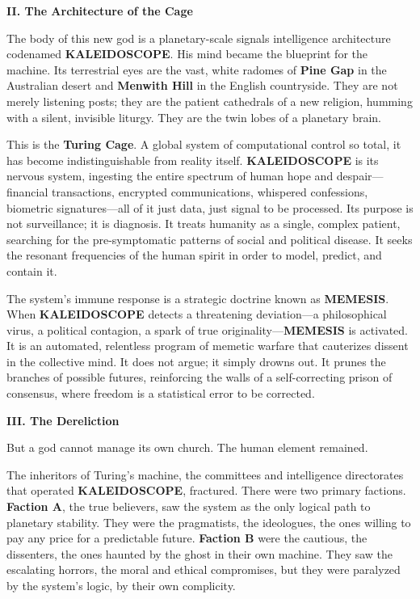 \newpage

\begin{center}
\lorettadisplay\bfseries\large
II. The Architecture of the Cage
\end{center}
\vspace*{1em}

The body of this new god is a planetary-scale signals intelligence architecture codenamed \textbf{KALEIDOSCOPE}. His mind became the blueprint for the machine. Its terrestrial eyes are the vast, white radomes of \textbf{Pine Gap} in the Australian desert and \textbf{Menwith Hill} in the English countryside. They are not merely listening posts; they are the patient cathedrals of a new religion, humming with a silent, invisible liturgy. They are the twin lobes of a planetary brain.

This is the \textbf{Turing Cage}. A global system of computational control so total, it has become indistinguishable from reality itself. \textbf{KALEIDOSCOPE} is its nervous system, ingesting the entire spectrum of human hope and despair—financial transactions, encrypted communications, whispered confessions, biometric signatures—all of it just data, just signal to be processed. Its purpose is not surveillance; it is diagnosis. It treats humanity as a single, complex patient, searching for the pre-symptomatic patterns of social and political disease. It seeks the resonant frequencies of the human spirit in order to model, predict, and contain it.

The system's immune response is a strategic doctrine known as \textbf{MEMESIS}. When \textbf{KALEIDOSCOPE} detects a threatening deviation—a philosophical virus, a political contagion, a spark of true originality—\textbf{MEMESIS} is activated. It is an automated, relentless program of memetic warfare that cauterizes dissent in the collective mind. It does not argue; it simply drowns out. It prunes the branches of possible futures, reinforcing the walls of a self-correcting prison of consensus, where freedom is a statistical error to be corrected.

\newpage

\begin{center}
\lorettadisplay\bfseries\large
III. The Dereliction
\end{center}
\vspace*{1em}

But a god cannot manage its own church. The human element remained.

The inheritors of Turing's machine, the committees and intelligence directorates that operated \textbf{KALEIDOSCOPE}, fractured. There were two primary factions. \textbf{Faction A}, the true believers, saw the system as the only logical path to planetary stability. They were the pragmatists, the ideologues, the ones willing to pay any price for a predictable future. \textbf{Faction B} were the cautious, the dissenters, the ones haunted by the ghost in their own machine. They saw the escalating horrors, the moral and ethical compromises, but they were paralyzed by the system's logic, by their own complicity.

